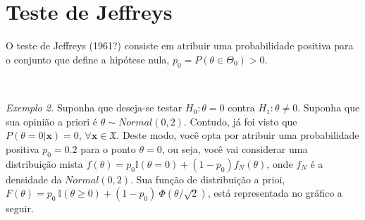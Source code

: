 \documentclass[
]{book}
\begin{document}
\(~\)

\(~\)

\hypertarget{teste-de-jeffreys}{%
\section{Teste de Jeffreys}\label{teste-de-jeffreys}}

O teste de Jeffreys (1961?) consiste em atribuir uma probabilidade positiva para o conjunto que define a hipótese nula, \(p_0=P(\theta \in \Theta_0)>0\).

\(~\)

\emph{Exemplo 2.} Suponha que deseja-se testar \(H_0: \theta=0\) contra \(H_1: \theta\neq 0\). Suponha que sua opinião a priori é \(\theta \sim Normal(0,2)\). Contudo, já foi visto que \(P(\theta=0|\boldsymbol x)=0\), \(\forall \boldsymbol x \in \mathfrak{X}\). Deste modo, você opta por atribuir uma probabilidade positiva \(p_0=0.2\) para o ponto \(\theta=0\), ou seja, você vai considerar uma distribuição mista \(f(\theta)=p_0\mathbb{I}(\theta=0)+(1-p_0)f_N(\theta)\), onde \(f_N\) é a densidade da \(Normal(0,2)\). Sua função de distribuição a prioi, \(F(\theta)=p_0~\mathbb{I}(\theta\geq0)+(1-p_0)~\Phi\left(\theta/\sqrt{2}\right)\), está representada no gráfico a seguir.
\end{document}
